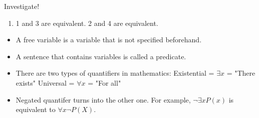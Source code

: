 \begin{mdframed}Investigate!
    \begin{enumerate}
        \item 1 and 3 are equivalent. 2 and 4 are equivalent.
    \end{enumerate}
\end{mdframed}

\begin{itemize}
    \item A free variable is a variable that is not specified beforehand.
    
    \item A sentence that contains variables is called a predicate.
    
    \item There are two types of quantifiers in mathematics:
    \newline Existential = $\exists x$ = "There exists"
    \newline Universal = $\forall x$ = "For all"
    
    \item Negated quantifer turns into the other one. For example, $\neg\exists x P(x)$ is equivalent to $\forall x \neg P(X)$.
\end{itemize}